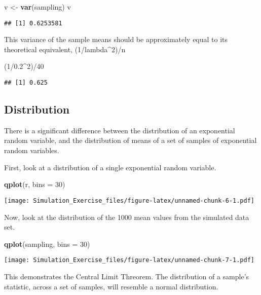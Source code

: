 \documentclass[]{article}
\newenvironment{Shaded}{\begin{snugshade}}{\end{snugshade}}
\newcommand{\KeywordTok}[1]{\textcolor[rgb]{0.13,0.29,0.53}{\textbf{{#1}}}}
\newcommand{\DataTypeTok}[1]{\textcolor[rgb]{0.13,0.29,0.53}{{#1}}}
\newcommand{\DecValTok}[1]{\textcolor[rgb]{0.00,0.00,0.81}{{#1}}}
\newcommand{\FloatTok}[1]{\textcolor[rgb]{0.00,0.00,0.81}{{#1}}}
\newcommand{\StringTok}[1]{\textcolor[rgb]{0.31,0.60,0.02}{{#1}}}
\newcommand{\NormalTok}[1]{{#1}}
\begin{document}
\begin{Shaded}
\begin{Highlighting}[]
\NormalTok{v <-}\StringTok{ }\KeywordTok{var}\NormalTok{(sampling)}
\NormalTok{v}
\end{Highlighting}
\end{Shaded}

\begin{verbatim}
## [1] 0.6253581
\end{verbatim}

This variance of the sample means should be approximately equal to its
theoretical equivalent, (1/lambda\^{}2)/n

\begin{Shaded}
\begin{Highlighting}[]
\NormalTok{(}\DecValTok{1}\NormalTok{/}\FloatTok{0.2}\NormalTok{^}\DecValTok{2}\NormalTok{)/}\DecValTok{40}
\end{Highlighting}
\end{Shaded}

\begin{verbatim}
## [1] 0.625
\end{verbatim}

\subsection{Distribution}\label{distribution}

There is a significant difference between the distribution of an
exponential random variable, and the distribution of means of a set of
samples of exponential random variables.

First, look at a distribution of a single exponential random variable.

\begin{Shaded}
\begin{Highlighting}[]
\KeywordTok{qplot}\NormalTok{(r, }\DataTypeTok{bins =} \DecValTok{30}\NormalTok{)}
\end{Highlighting}
\end{Shaded}

\texttt{[image: Simulation\_Exercise\_files/figure-latex/unnamed-chunk-6-1.pdf]}

Now, look at the distribution of the 1000 mean values from the simulated
data set.

\begin{Shaded}
\begin{Highlighting}[]
\KeywordTok{qplot}\NormalTok{(sampling, }\DataTypeTok{bins =} \DecValTok{30}\NormalTok{)}
\end{Highlighting}
\end{Shaded}

\texttt{[image: Simulation\_Exercise\_files/figure-latex/unnamed-chunk-7-1.pdf]}

This demonstrates the Central Limit Threorem. The distribution of a
sample's statistic, across a set of samples, will resemble a normal
distribution.
\end{document}
